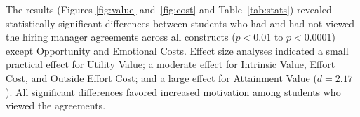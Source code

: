 The results (Figures \ref{fig:value} and~\ref{fig:cost} and Table~\ref{tab:stats}) revealed statistically significant differences between students who had and had not viewed the hiring manager agreements across all constructs ($p < 0.01$ to $p < 0.0001$) except Opportunity and Emotional Costs. Effect size analyses indicated a small practical effect for Utility Value; a moderate effect for Intrinsic Value, Effort Cost, and Outside Effort Cost; and a large effect for Attainment Value ($d = 2.17$). All significant differences favored increased motivation among students who viewed the agreements.



